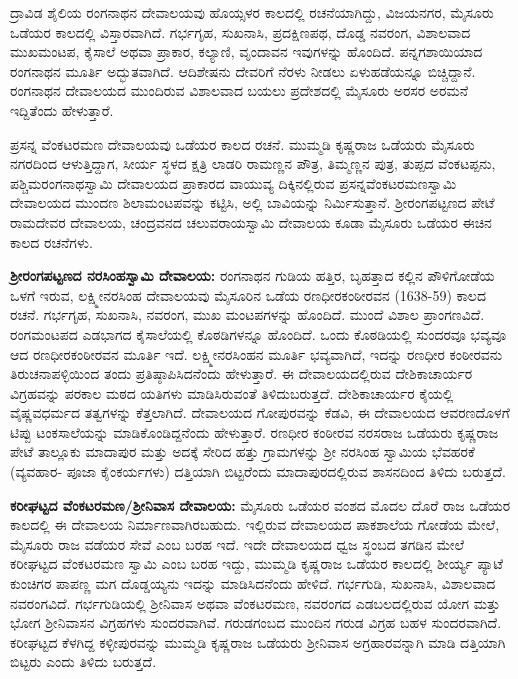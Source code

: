 ದ್ರಾವಿಡ ಶೈಲಿಯ ರಂಗನಾಥನ ದೇವಾಲಯವು ಹೊಯ್ಸಳರ ಕಾಲದಲ್ಲಿ ರಚನೆಯಾಗಿದ್ದು, ವಿಜಯನಗರ, ಮೈಸೂರು ಒಡೆಯರ ಕಾಲದಲ್ಲಿ ವಿಸ್ತಾರವಾಗಿದೆ. ಗರ್ಭಗೃಹ, ಸುಖನಾಸಿ, ಪ್ರದಕ್ಷಿಣಪಥ, ದೊಡ್ಡ ನವರಂಗ, ವಿಶಾಲವಾದ ಮುಖಮಂಟಪ, ಕೈಸಾಲೆ ಅಥವಾ ಪ್ರಾಕಾರ, ಕಲ್ಯಾಣಿ, ವೃಂದಾವನ ಇವುಗಳನ್ನು ಹೊಂದಿದೆ. ಪನ್ನಗಶಾಯಿಯಾದ ರಂಗನಾಥನ ಮೂರ್ತಿ ಅದ್ಭುತವಾಗಿದೆ. ಆದಿಶೇಷನು ದೇವರಿಗೆ ನೆರಳು ನೀಡಲು ಏಳುಹಡೆಯನ್ನೂ ಬಿಚ್ಚಿದ್ದಾನೆ. ರಂಗನಾಥನ ದೇವಾಲಯದ ಮುಂದಿರುವ ವಿಶಾಲವಾದ ಬಯಲು ಪ್ರದೇಶದಲ್ಲಿ ಮೈಸೂರು ಅರಸರ ಅರಮನೆ ಇದ್ದಿತೆಂದು ಹೇಳುತ್ತಾರೆ.

ಪ್ರಸನ್ನ ವೆಂಕಟರಮಣ ದೇವಾಲಯವು ಒಡೆಯರ ಕಾಲದ ರಚನೆ. ಮುಮ್ಮಡಿ ಕೃಷ್ಣರಾಜ ಒಡೆಯರು ಮೈಸೂರು ನಗರದಿಂದ ಆಳುತ್ತಿದ್ದಾಗ, ಸೀರ್ಯ ಸ್ಥಳದ ಕ್ಷತ್ರಿ ಲಾಡರಿ ರಾಮಣ್ಣನ ಪೌತ್ರ, ತಿಮ್ಮಣ್ಣನ ಪುತ್ರ, ತುಪ್ಪದ ವೆಂಕಟಪ್ಪನು, ಪಶ್ಚಿಮರಂಗನಾಥಸ್ವಾಮಿ ದೇವಾಲಯದ ಪ್ರಾಕಾರದ ವಾಯುವ್ಯ ದಿಕ್ಕಿನಲ್ಲಿರುವ ಪ್ರಸನ್ನವೆಂಕಟರಮಣಸ್ವಾಮಿ ದೇವಾಲಯದ ಮುಂದಣ ಶಿಲಾಮಂಟಪವನ್ನು ಕಟ್ಟಿಸಿ, ಅಲ್ಲಿ ಬಾವಿಯನ್ನು ನಿರ್ಮಿಸುತ್ತಾನೆ. ಶ‍್ರೀರಂಗಪಟ್ಟಣದ ಪೇಟೆ ರಾಮದೇವರ ದೇವಾಲಯ, ಚಂದ್ರವನದ ಚಲುವರಾಯಸ್ವಾಮಿ ದೇವಾಲಯ ಕೂಡಾ ಮೈಸೂರು ಒಡೆಯರ ಈಚಿನ ಕಾಲದ ರಚನೆಗಳು.

\textbf{ಶ‍್ರೀರಂಗಪಟ್ಟಣದ ನರಸಿಂಹಸ್ವಾಮಿ ದೇವಾಲಯ:} ರಂಗನಾಥನ ಗುಡಿಯ ಹತ್ತಿರ, ಬೃಹತ್ತಾದ ಕಲ್ಲಿನ ಪೌಳಿಗೋಡೆಯ ಒಳಗೆ ಇರುವ, ಲಕ್ಷ್ಮೀನರಸಿಂಹ ದೇವಾಲಯವು ಮೈಸೂರಿನ ಒಡೆಯ ರಣಧೀರಕಂಠೀರವನ (1638-59) ಕಾಲದ ರಚನೆ. ಗರ್ಭಗೃಹ, ಸುಖನಾಸಿ, ನವರಂಗ, ಮುಖ ಮಂಟಪಗಳನ್ನು ಹೊಂದಿದೆ. ಮುಂದೆ ವಿಶಾಲ ಪ್ರಾಂಗಣವಿದೆ. ರಂಗಮಂಟಪದ ಎಡಭಾಗದ ಕೈಸಾಲೆಯಲ್ಲಿ ಕೊಠಡಿಗಳನ್ನೂ ಹೊಂದಿದೆ. ಒಂದು ಕೊಠಡಿಯಲ್ಲಿ ಸುಂದರವೂ ಭವ್ಯವೂ ಆದ ರಣಧೀರಕಂಠೀರವನ ಮೂರ್ತಿ ಇದೆ. ಲಕ್ಷ್ಮೀನರಸಿಂಹನ ಮೂರ್ತಿ ಭವ್ಯವಾಗಿದೆ, ಇದನ್ನು ರಣಧೀರ ಕಂಠೀರವನು ತಿರುಚನಾಪಳ್ಳಿಯಿಂದ ತಂದು ಪ್ರತಿಷ್ಠಾಪಿಸಿದನೆಂದು ಹೇಳುತ್ತಾರೆ. ಈ ದೇವಾಲಯದಲ್ಲಿರುವ ದೇಶಿಕಾಚಾರ್ಯರ ವಿಗ್ರಹವನ್ನು ಪರಕಾಲ ಮಠದ ಯತಿಗಳು ಮಾಡಿಸಿರುವಂತೆ ತಿಳಿದುಬರುತ್ತದೆ. ದೇಶಿಕಾಚಾರ್ಯರ ಕೈಯಲ್ಲಿ ವೈಷ್ಣವಧರ್ಮದ ತತ್ವಗಳನ್ನು ಕೆತ್ತಲಾಗಿದೆ. ದೇವಾಲಯದ ಗೋಪುರವನ್ನು ಕೆಡವಿ, ಈ ದೇವಾಲಯದ ಆವರಣದೊಳಗೆ ಟಿಪ್ಪು ಟಂಕಸಾಲೆಯನ್ನು ಮಾಡಿಕೊಂಡಿದ್ದನೆಂದು ಹೇಳುತ್ತಾರೆ. ರಣಧೀರ ಕಂಠೀರವ ನರಸರಾಜ ಒಡೆಯರು ಕೃಷ್ಣರಾಜ ಪೇಟೆ ತಾಲ್ಲೂಕು ಮಾದಾಪುರ ಮತ್ತು ಅದಕ್ಕೆ ಸೇರಿದ ಹತ್ತು ಗ್ರಾಮಗಳನ್ನು ಶ‍್ರೀ ನರಸಿಂಹ ಸ್ವಾಮಿಯ ಭೆವಹರಕೆ (ವ್ಯವಹಾರ- ಪೂಜಾ ಕೈಂಕರ್ಯಗಳು) ದತ್ತಿಯಾಗಿ ಬಿಟ್ಟರೆಂದು ಮಾದಾಪುರದಲ್ಲಿರುವ ಶಾಸನದಿಂದ ತಿಳಿದು ಬರುತ್ತದೆ.

\textbf{ಕರೀಘಟ್ಟದ ವೆಂಕಟರಮಣ/ಶ‍್ರೀನಿವಾಸ ದೇವಾಲಯ:} ಮೈಸೂರು ಒಡೆಯರ ವಂಶದ ಮೊದಲ ದೊರೆ ರಾಜ ಒಡೆಯರ ಕಾಲದಲ್ಲಿ ಈ ದೇವಾಲಯ ನಿರ್ಮಾಣವಾಗಿರಬಹುದು. ಇಲ್ಲಿರುವ ದೇವಾಲಯದ ಪಾಕಶಾಲೆಯ ಗೋಡೆಯ ಮೇಲೆ, ಮೈಸೂರು ರಾಜ ವಡೆಯರ ಸೇವೆ ಎಂಬ ಬರಹ ಇದೆ. ಇದೇ ದೇವಾಲಯದ ಧ್ವಜ ಸ್ಥಂಬದ ತಗಡಿನ ಮೇಲೆ ಕರೀಘಟ್ಟದ ವೆಂಕಟರಮಣ ಸ್ವಾಮಿ ಎಂಬ ಬರಹ ಇದ್ದು, ಮುಮ್ಮಡಿ ಕೃಷ್ಣರಾಜ ಒಡೆಯರ ಕಾಲದಲ್ಲಿ ಶೀರ್ಯ್ಯ ಪ್ಯಾಟೆ ಕುಂಚಿಗರ ಪಾಪಣ್ಣ ಮಗ ದೊಡ್ಡಯ್ಯನು ಇದನ್ನು ಮಾಡಿಸಿದನೆಂದು ಹೇಳಿದೆ. ಗರ್ಭಗುಡಿ, ಸುಖನಾಸಿ, ವಿಶಾಲವಾದ ನವರಂಗವಿದೆ. ಗರ್ಭಗುಡಿಯಲ್ಲಿ ಶ‍್ರೀನಿವಾಸ ಅಥವಾ ವೆಂಕಟರಮಣ, ನವರಂಗದ ಎಡಬಲದಲ್ಲಿರುವ ಯೋಗ ಮತ್ತು ಭೋಗ ಶ‍್ರೀನಿವಾಸನ ವಿಗ್ರಹಗಳು ಸುಂದರವಾಗಿವೆ. ಗರುಡಗಂಬದ ಮುಂದಿನ ಗರುಡ ವಿಗ್ರಹ ಬಹಳ ಸುಂದರವಾಗಿದೆ. ಕರೀಘಟ್ಟದ ಕೆಳಗಿದ್ದ ಕಳ್ಳೀಪುರವನ್ನು ಮುಮ್ಮಡಿ ಕೃಷ್ಣರಾಜ ಒಡೆಯರು ಶ‍್ರೀನಿವಾಸ ಅಗ್ರಹಾರವನ್ನಾಗಿ ಮಾಡಿ ದತ್ತಿಯಾಗಿ ಬಿಟ್ಟರು ಎಂದು ತಿಳಿದು ಬರುತ್ತದೆ.

